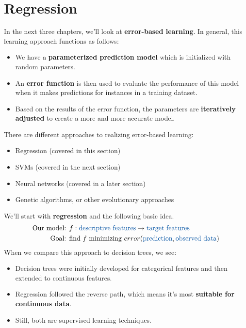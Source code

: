 \section{Regression}

In the next three chapters, we'll look at \textbf{error-based learning}. In general, this learning approach functions as follows:
\begin{itemize}
  \item We have a \textbf{parameterized prediction model} which is initialized with random parameters.
  \item An \textbf{error function} is then used to evaluate the performance of this model when it makes predictions for instances in a training dataset.
  \item Based on the results of the error function, the parameters are \textbf{iteratively adjusted} to create a more and more accurate model.
\end{itemize}

There are different approaches to realizing error-based learning:
\begin{itemize}
  \item Regression (covered in this section)
  \item SVMs (covered in the next section)
  \item Neural networks (covered in a later section)
  \item Genetic algorithms, or other evolutionary approaches
\end{itemize}

We'll start with \textbf{regression} and the following basic idea. 
\begin{align*}
  \text{Our model: } & f : \text{\color{mathblue}descriptive features} \rightarrow \text{\color{mathblue}target features}\\
  \text{Goal: } & \text{find } f \text{ minimizing } error(\text{\color{mathblue}prediction}, \text{\color{mathblue}observed data})
\end{align*}
When we compare this approach to decision trees, we see:
\begin{itemize}
  \item Decision trees were initially developed for categorical features and then extended to continuous features.
  \item Regression followed the reverse path, which means it's most \textbf{suitable for continuous data}.
  \item Still, both are supervised learning techniques.
\end{itemize}









